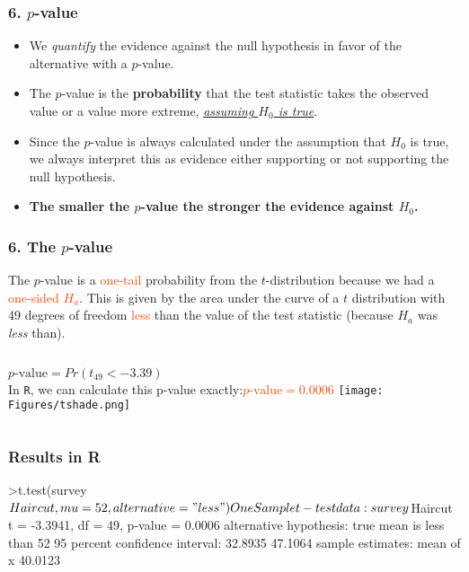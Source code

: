 \begin{frame}
\frametitle{6. $p$-value}
\begin{itemize}
    \item
    We \emph{quantify} the evidence against the null hypothesis in favor of the alternative with a $p$-value.  \\
    \item
    The $p$-value is the \textbf{probability} that the test statistic takes the observed value or a value more extreme, \emph{\underline{assuming $H_0$ is true}}.\\
    \item
    Since the $p$-value is always calculated under the assumption that $H_0$ is true, we always interpret this as evidence either supporting or not supporting the null hypothesis.
    \item
    \textbf{The smaller the $p$-value the stronger the evidence against $H_0$.}
\end{itemize}
\end{frame}

\begin{frame}[label=pslide]
\frametitle{6. The $p$-value}
The $p$-value is a \textcolor{OrangeRed}{one-tail} probability from the $t$-distribution because we had a \textcolor{OrangeRed}{one-sided $H_a$}.  This is given by the area under the curve of a $t$ distribution with 49 degrees of freedom \textcolor{OrangeRed}{less} than the value of the test statistic (because $H_a$ was \emph{less} than).
\vskip15pt
\begin{columns}
$\displaystyle p\mbox{-value} =  Pr(t_{49}<-3.39)$\\
\vskip10pt
In \texttt{R}, we can calculate this p-value exactly:\textcolor{OrangeRed}{$p\mbox{-value}=0.0006$}
\texttt{[image: Figures/tshade.png]}
\end{columns}
\end{frame}

\begin{frame}[fragile]
\frametitle{Results in R}
\begin{lcverbatim}
>t.test(survey$Haircut,mu=52,alternative="less")

	One Sample t-test

data:  survey$Haircut
t = -3.3941, df = 49, p-value = 0.0006
alternative hypothesis: true mean is less than 52
95 percent confidence interval:
 32.8935 47.1064
sample estimates:
mean of x
  40.0123
\end{lcverbatim}
\end{frame}


